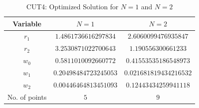 \documentclass[letterpaper, 10 pt, conference]{IEEEtran}  %
\newcommand{\comments}[1]{}
\begin{document}
\begin{table}
\caption{CUT4: Optimized Solution for $N=1$ and $N=2$ }\vspace{-0.1in}
\label{optsoln12}
\begin{center}
\begin{tabular}{|c||c|c|}
\hline
Variable & $N=1$ & $N=2$\\
\hline
$r_1$ & $1.4861736616297834 $  &  $2.6060099476935847 $  \\
\hline
$r_2$ & $3.2530871022700643 $  &  $1.190556300661233 $  \\
\hline
$w_0$ & $0.5811010092660772 $  &  $0.41553535186548973 $  \\
\hline
$w_1$ & $0.20498484723245053 $  &  $0.021681819434216532 $  \\
\hline
$w_2$ & $0.00446464813451093 $  &  $0.12443434259941118 $  \\
\hline
No. of points & $5$  &  $9$  \\
\hline
\end{tabular}
\end{center}\vspace{-0.2in}
\end{table}





\end{document}
